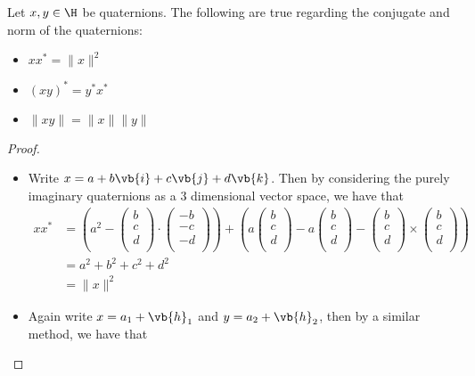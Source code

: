 \documentclass[a4paper]{article}
\begin{document}
\begin{prp}{}{} Let $x,y\in\H$ be quaternions. The following are true regarding the conjugate and norm of the quaternions: 
\begin{itemize}
\item $xx^\ast=\|x\|^2$
\item $(xy)^\ast=y^\ast x^\ast$
\item $\|xy\|=\|x\|\|y\|$
\end{itemize} \tcbline
\begin{proof}~\\
\begin{itemize}
\item Write $x=a+b\vb{i}+c\vb{j}+d\vb{k}$. Then by considering the purely imaginary quaternions as a $3$ dimensional vector space, we have that 
\begin{align*}
xx^\ast&=\left(a^2-\begin{pmatrix}
b\\c\\d\\\end{pmatrix}\cdot\begin{pmatrix}-b\\-c\\-d\\\end{pmatrix}\right)+\left(a\begin{pmatrix}b\\c\\d\\\end{pmatrix}-a\begin{pmatrix}b\\c\\d\\\end{pmatrix}-\begin{pmatrix}b\\c\\d\\\end{pmatrix}\times\begin{pmatrix}b\\c\\d\\\end{pmatrix}\right)\\
&=a^2+b^2+c^2+d^2\\
&=\|x\|^2
\end{align*}
\item Again write $x=a_1+\vb{h}_1$ and $y=a_2+\vb{h}_2$, then by a similar method, we have that 

\end{itemize}
\end{proof}
\end{prp}
\end{document}
